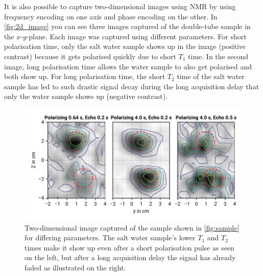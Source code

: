 \documentclass[
    parskip=half, 
    twoside=false,
    twocolumn=true,
    fontsize=11pt,
]{scrarticle}
\begin{document}
It is also possible to capture two-dimensional images using NMR by using frequency encoding on one axis and phase encoding on the other. In \autoref{fig:2d_image} you can see three images captured of the double-tube sample in the $x$-$y$-plane. Each image was captured using different parameters. For short polarisation time, only the salt water sample shows up in the image (positive contrast) because it gets polarised quickly due to short $T_1$ time. In the second image, long polarisation time allows the water sample to also get polarised and both show up. For long polarisation time, the short $T_2$ time of the salt water sample has led to such drastic signal decay during the long acquisition delay that only the water sample shows up (negative contrast).

\begin{figure}
    \centering
    \includegraphics{figures/08 2d imaging.pdf}
    \caption{Two-dimensional image captured of the sample shown in \autoref{fig:sample} for differing parameters. The salt water sample's lower $T_1$ and $T_2$ times make it show up even after a short polarisation pulse as seen on the left, but after a long acquisition delay the signal has already faded as illustrated on the right.}
    \label{fig:2d_image}
\end{figure}

\pagebreak
\end{document}
